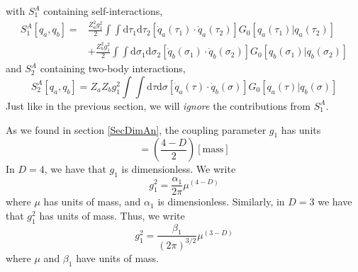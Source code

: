 with $S_{1}^{A}$ containing self-interactions,
\begin{equation}
\begin{split}
	S_{1}^{A}[q_{a}, q_{b}] = {}& \frac{Z_{a}^{2} g_{1}^{2}}{2} \int \int \mathrm{d}\tau_{1} \mathrm{d}\tau_{2} \left[ \dot{q}_{a}(\tau_{1}) \cdot \dot{q}_{a}(\tau_{2}) \right] G_{0}[q_{a}(\tau_{1}) | q_{a}(\tau_{2})] \\
	&+ \frac{Z_{b}^{2}g_{1}^{2}}{2} \int \int \mathrm{d}\sigma_{1} \mathrm{d}\sigma_{2} \left[ \dot{q}_{b}(\sigma_{1}) \cdot \dot{q}_{b}(\sigma_{2}) \right] G_{0}[q_{b}(\sigma_{1}) | q_{b}(\sigma_{2})]
\end{split}
\end{equation}
and $S_{2}^{A}$ containing two-body interactions,
\begin{equation}
	S_{2}^{A}[q_{a}, q_{b}] = Z_{a} Z_{b} g_{1}^{2} \int \int \mathrm{d}\tau \mathrm{d}\sigma \left[ \dot{q}_{a}(\tau) \cdot \dot{q}_{b}(\sigma) \right] G_{0}\left[ q_{a}(\tau) | q_{b}(\sigma) \right] \label{S2Vec}
\end{equation}
Just like in the previous section, we will \textit{ignore} the contributions from $S_{1}^{A}$.

As we found in section \ref{SecDimAn}, the coupling parameter $g_{1}$ has units
\begin{equation}
	[g_{1}] = \left( \frac{4 - D}{2} \right) [\text{mass}]
\end{equation}
In $D = 4$, we have that $g_{1}$ is dimensionless. We write
\begin{equation}
	g_{1}^{2} = \frac{\alpha_{1}}{2 \pi} \mu^{(4 - D)}
\end{equation}
where $\mu$ has units of mass, and $\alpha_{1}$ is dimensionless. Similarly, in $D = 3$ we have that $g_{1}^{2}$ has units of mass. Thus, we write
\begin{equation}
	g_{1}^{2} = \frac{\beta_{1}}{(2 \pi)^{3/2}} \mu^{(3 - D)}
\end{equation}
where $\mu$ and $\beta_{1}$ have units of mass.
